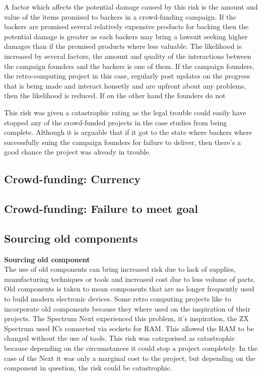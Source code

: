 A factor which affects the potential damage caused by this risk is the amount and value of the items promised to backers in a crowd-funding campaign. If the backers are promised several relatively expensive products for backing then the potential damage is greater as each backers may bring a lawsuit seeking higher damages than if the promised products where less valuable. The likelihood is increased by several factors, the amount and quality of the interactions between the campaign founders and the backers is one of them. If the campaign founders, the retro-computing project in this case, regularly post updates on the progress that is being made and interact honsetly and are upfront about any problems, then the likelihood is reduced. If on the other hand the founders do not 


This risk was given a catastrophic rating as the legal trouble could easily have stopped any of the crowd-funded projects in the case studies from being complete. Although it is arguable that if it got to the state where backers where successfully suing the campaign founders for failure to deliver, then there's a good chance the project was already in trouble.\\


\subsection{Crowd-funding: Currency}

\subsection{Crowd-funding: Failure to meet goal}


\subsection{Sourcing old components}
\textbf{Sourcing old component}\\
The use of old components can bring increased risk due to lack of supplies, manufacturing techniques or tools and increased cost due to less volume of parts. Old components is taken to mean components that are no longer frequently used to build modern electronic devices. Some retro computing projects like to incorporate old components because they where used on the inspiration of their projects. The Spectrum Next experienced this problem, it's inspiration, the ZX Spectrum used ICs connected via sockets for RAM. This allowed the RAM to be changed without the use of tools. This risk was categorised as catastrophic because depending on the circumstances it could stop a project completely. In the case of the Next it was only a marginal cost to the project, but depending on the component in question, the risk could be catastrophic.\\

